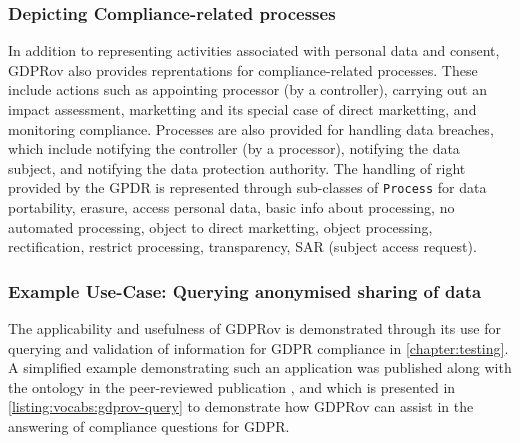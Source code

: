 \subsubsection{Depicting Compliance-related processes}
In addition to representing activities associated with personal data and consent, GDPRov also provides reprentations for compliance-related processes.
These include actions such as appointing processor (by a controller), carrying out an impact assessment, marketting and its special case of direct marketting, and monitoring compliance.
Processes are also provided for handling data breaches, which include notifying the controller (by a processor), notifying the data subject, and notifying the data protection authority.
The handling of right provided by the GPDR is represented through sub-classes of \texttt{Process} for data portability, erasure, access personal data, basic info about processing, no automated processing, object to direct marketting, object processing, rectification, restrict processing, transparency, SAR (subject access request).



\subsubsection{Example Use-Case: Querying anonymised sharing of data}
The applicability and usefulness of GDPRov is demonstrated through its use for querying and validation of information for GDPR compliance in \autoref{chapter:testing}.
A simplified example demonstrating such an application was published along with the ontology in the peer-reviewed publication \cite{pandit_modelling_2017}, and which is presented in \autoref{listing:vocabs:gdprov-query} to demonstrate how GDPRov can assist in the answering of compliance questions for GDPR.


